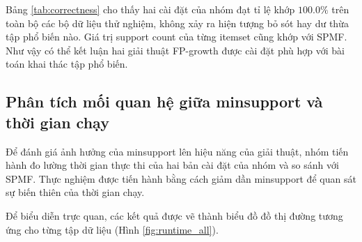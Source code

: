 \documentclass[conference]{IEEEtran}
\begin{document}
\begin{table}[htbp]
\centering
\caption{Kết quả đối chiếu của hai bản cài đặt so với SPMF}
\label{tab:correctness}
\end{table}

Bảng \ref{tab:correctness} cho thấy hai cài đặt của nhóm đạt tỉ lệ khớp $100.0\%$ trên toàn bộ các bộ dữ liệu thử nghiệm, không xảy ra hiện tượng bỏ sót hay dư thừa tập phổ biến nào. Giá trị support count của từng itemset cũng khớp với SPMF. Như vậy có thể kết luận hai giải thuật FP-growth được cài đặt phù hợp với bài toán khai thác tập phổ biến.

\subsection{Phân tích mối quan hệ giữa minsupport và thời gian chạy}
\label{subsec:minsup-vs-runtime}
Để đánh giá ảnh hưởng của minsupport lên hiệu năng của giải thuật, nhóm tiến hành đo lường thời gian thực thi của hai bản cài đặt của nhóm và so sánh với SPMF. Thực nghiệm được tiến hành bằng cách giảm dần minsupport để quan sát sự biến thiên của thời gian chạy. 

Để biểu diễn trực quan, các kết quả được vẽ thành biểu đồ đồ thị đường tương ứng cho từng tập dữ liệu (Hình \ref{fig:runtime_all}).
\end{document}
